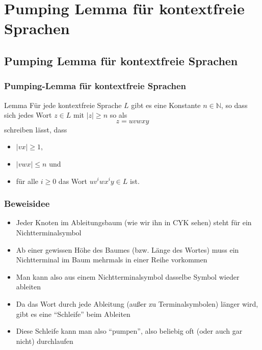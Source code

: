 \section{Pumping Lemma für kontextfreie Sprachen}
\subsection{Pumping Lemma für kontextfreie Sprachen}
\begin{frame}
	\frametitle{Pumping-Lemma für kontextfreie Sprachen}
	\begin{exampleblock}{Lemma}
		Für jede kontextfreie Sprache $L$ gibt es eine Konstante $n \in \mathbb{N}$,
		so dass sich jedes Wort $z \in L$ mit $|z| \geq n$ so als
		$$ z = uvwxy $$
		schreiben lässt, dass
		\begin{itemize}
			\item $|vx| \geq 1$,
			\item $|vwx| \leq n$ und
			\item für alle $i \geq 0$ das Wort $uv^iwx^iy \in L$ ist.
		\end{itemize}
	\end{exampleblock}
\end{frame}

\begin{frame}
	\frametitle{Beweisidee}
	\begin{itemize}
		\item Jeder Knoten im Ableitungsbaum (wie wir ihn in CYK sehen) steht für ein Nichtterminalsymbol
		\item Ab einer gewissen Höhe des Baumes (bzw. Länge des Wortes) muss ein Nichtterminal im Baum mehrmals in einer Reihe vorkommen
		\item Man kann also aus einem Nichtterminalsymbol dasselbe Symbol wieder ableiten
		\item Da das Wort durch jede Ableitung (außer zu Terminalsymbolen) länger wird, gibt es eine "`Schleife"' beim Ableiten
		\item Diese Schleife kann man also "`pumpen"', also beliebig oft (oder auch gar nicht) durchlaufen
	\end{itemize}
\end{frame}

